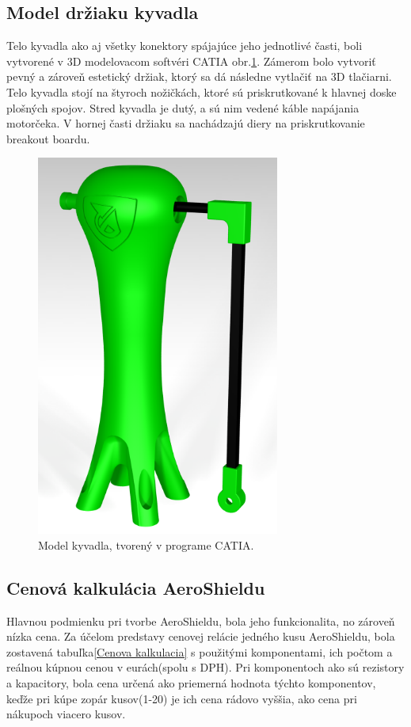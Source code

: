 \subsection{Model držiaku kyvadla}

Telo kyvadla ako aj všetky konektory spájajúce jeho jednotlivé časti, boli vytvorené v 3D modelovacom softvéri CATIA obr.\ref{OBRAZOK 1.1}. Zámerom bolo vytvoriť pevný a zároveň estetický držiak, ktorý sa dá následne vytlačiť na 3D tlačiarni. Telo kyvadla stojí na štyroch nožičkách, ktoré sú priskrutkované k hlavnej doske plošných spojov. Stred kyvadla je dutý, a sú nim vedené káble napájania motorčeka. V hornej časti držiaku sa nachádzajú diery na priskrutkovanie breakout boardu. 

\begin{figure}
	\centering
	\includegraphics[width=80mm]{obr/AeroCatiaa.png}
	\caption{Model kyvadla, tvorený v programe CATIA.}\label{OBRAZOK 1.1}
\end{figure}

\subsection{Cenová kalkulácia AeroShieldu}

Hlavnou podmienku pri tvorbe AeroShieldu, bola jeho funkcionalita, no zároveň nízka cena. Za účelom predstavy cenovej relácie jedného kusu AeroShieldu, bola zostavená tabuľka\ref{Cenova kalkulacia} s použitými komponentami, ich počtom a reálnou kúpnou cenou v eurách(spolu s DPH). Pri komponentoch ako sú rezistory a kapacitory, bola cena určená ako priemerná hodnota týchto komponentov, keďže pri kúpe zopár kusov(1-20) je ich cena rádovo vyššia, ako cena pri nákupoch viacero kusov. 


